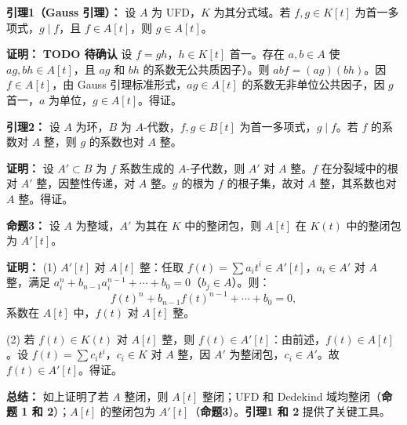 \documentclass[UTF8]{ctexart}
\begin{document}
\begin{enumerate}
\textbf{引理1（Gauss 引理）：} 设 \(A\) 为 UFD，\(K\) 为其分式域。若 \(f, g \in K[t]\) 为首一多项式，\(g \mid f\)，且 \(f \in A[t]\)，则 \(g \in A[t]\)。

\textbf{证明：} \textbf{TODO 待确认} 设 \(f = g h\)，\(h \in K[t]\) 首一。存在 \(a, b \in A\) 使 \(a g, b h \in A[t]\)，且 \(a g\) 和 \(b h\) 的系数无公共质因子）。则 \(a b f = (a g)(b h)\)。因 \(f \in A[t]\)，由 Gauss 引理标准形式，\(a g \in A[t]\) 的系数无非单位公共因子，因 \(g\) 首一，\(a\) 为单位，\(g \in A[t]\)。得证。

\textbf{引理2：} 设 \(A\) 为环，\(B\) 为 \(A\)-代数，\(f, g \in B[t]\) 为首一多项式，\(g \mid f\)。若 \(f\) 的系数对 \(A\) 整，则 \(g\) 的系数也对 \(A\) 整。

\textbf{证明：} 设 \(A' \subset B\) 为 \(f\) 系数生成的 \(A\)-子代数，则 \(A'\) 对 \(A\) 整。\(f\) 在分裂域中的根对 \(A'\) 整，因整性传递，对 \(A\) 整。\(g\) 的根为 \(f\) 的根子集，故对 \(A\) 整，其系数也对 \(A\) 整。得证。

\textbf{命题3：} 设 \(A\) 为整域，\(A'\) 为其在 \(K\) 中的整闭包，则 \(A[t]\) 在 \(K(t)\) 中的整闭包为 \(A'[t]\)。

\textbf{证明：} (1) \(A'[t]\) 对 \(A[t]\) 整：任取 \(f(t) = \sum a_i t^i \in A'[t]\)，\(a_i \in A'\) 对 \(A\) 整，满足 \(a_i^n + b_{n-1} a_i^{n-1} + \cdots + b_0 = 0\)（\(b_j \in A\)）。则：
\[
f(t)^n + b_{n-1} f(t)^{n-1} + \cdots + b_0 = 0,
\]
系数在 \(A[t]\) 中，\(f(t)\) 对 \(A[t]\) 整。

(2) 若 \(f(t) \in K(t)\) 对 \(A[t]\) 整，则 \(f(t) \in A'[t]\)：由前述，\(f(t) \in A[t]\)。设 \(f(t) = \sum c_i t^i\)，\(c_i \in K\) 对 \(A\) 整，因 \(A'\) 为整闭包，\(c_i \in A'\)。故 \(f(t) \in A'[t]\)。得证。

\textbf{总结：} 如上证明了若 \(A\) 整闭，则 \(A[t]\) 整闭；UFD 和 Dedekind 域均整闭（\textbf{命题 1 和 2}）；\(A[t]\) 的整闭包为 \(A'[t]\)（\textbf{命题3}）。\textbf{引理1 和 2} 提供了关键工具。




\end{enumerate}
\end{document}
